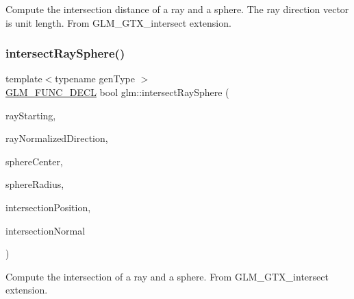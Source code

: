 Compute the intersection distance of a ray and a sphere. The ray direction vector is unit length. From G\+L\+M\+\_\+\+G\+T\+X\+\_\+intersect extension. \mbox{\label{group__gtx__intersect_gad28c00515b823b579c608aafa1100c1d}} 
\subsubsection{\texorpdfstring{intersect\+Ray\+Sphere()}{intersectRaySphere()}\hspace{0.1cm}{\footnotesize\ttfamily [2/2]}}
{\footnotesize\ttfamily template$<$typename gen\+Type $>$ \\
\hyperlink{setup_8hpp_ab2d052de21a70539923e9bcbf6e83a51}{G\+L\+M\+\_\+\+F\+U\+N\+C\+\_\+\+D\+E\+CL} bool glm\+::intersect\+Ray\+Sphere (\begin{DoxyParamCaption}\item[{gen\+Type const \&}]{ray\+Starting,  }\item[{gen\+Type const \&}]{ray\+Normalized\+Direction,  }\item[{gen\+Type const \&}]{sphere\+Center,  }\item[{const typename gen\+Type\+::value\+\_\+type}]{sphere\+Radius,  }\item[{gen\+Type \&}]{intersection\+Position,  }\item[{gen\+Type \&}]{intersection\+Normal }\end{DoxyParamCaption})}

Compute the intersection of a ray and a sphere. From G\+L\+M\+\_\+\+G\+T\+X\+\_\+intersect extension. \mbox{\label{group__gtx__intersect_ga65bf2c594482f04881c36bc761f9e946}} 
